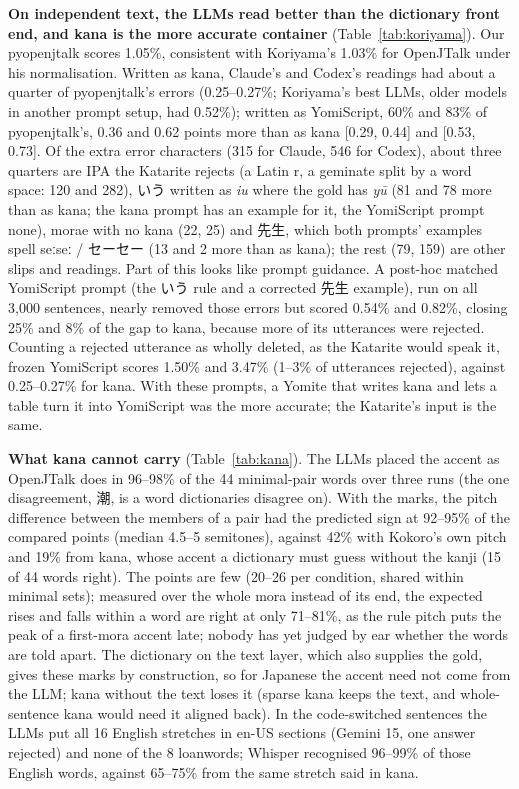 \documentclass{Interspeech}
\newcommand{\ys}[1]{\mbox{\ipafont #1}}
\begin{document}
\textbf{On independent text, the LLMs read better than the dictionary front end, and kana is the more accurate
container} (Table~\ref{tab:koriyama}). Our pyopenjtalk scores 1.05\%, consistent with Koriyama's 1.03\% for
OpenJTalk under his normalisation. Written as kana, Claude's and Codex's readings had about a quarter of pyopenjtalk's errors
(0.25--0.27\%; Koriyama's best LLMs, older models in another prompt setup, had 0.52\%); written as YomiScript, 60\% and
83\% of pyopenjtalk's, 0.36 and 0.62 points more than as kana [0.29, 0.44] and [0.53, 0.73]. Of the extra
error characters (315 for Claude, 546 for Codex), about three quarters are IPA the Katarite rejects (a Latin \ys{r},
a geminate split by a word space: 120 and 282), いう written as \emph{iu} where the gold has \emph{yū} (81 and 78
more than as kana; the kana prompt has an example for it, the YomiScript prompt none), morae with no kana (22, 25)
and 先生, which both prompts' examples spell \ys{seːseː} / セーセー (13 and 2 more than as kana); the rest
(79, 159) are other slips and readings. Part of this looks like prompt guidance. A post-hoc matched YomiScript prompt (the いう rule and a corrected 先生 example), run on all 3{,}000 sentences, nearly
removed those errors but scored 0.54\% and 0.82\%, closing 25\% and 8\% of the gap to kana, because more of its
utterances were rejected. Counting a rejected utterance as wholly deleted, as the Katarite would speak it, frozen
YomiScript scores 1.50\% and 3.47\% (1--3\% of utterances rejected), against 0.25--0.27\% for kana. With these prompts, a Yomite that writes
kana and lets a table turn it into YomiScript was the more accurate; the Katarite's input is the same.

\textbf{What kana cannot carry} (Table~\ref{tab:kana}). The LLMs placed the accent as OpenJTalk does in 96--98\% of
the 44 minimal-pair words over three runs (the one disagreement, 潮, is a word dictionaries disagree on). With the
marks, the pitch difference between the members of a pair had the predicted sign at 92--95\% of the compared points
(median 4.5--5 semitones), against 42\% with Kokoro's own pitch and 19\% from kana, whose accent a dictionary must
guess without the kanji (15 of 44 words right). The points are few (20--26 per condition, shared within minimal
sets); measured over the whole mora instead of its end, the expected rises and falls within a word
are right at only 71--81\%, as the rule pitch puts the peak of a first-mora accent late;
nobody has yet judged by ear whether the words are told apart. The dictionary on the text layer, which also supplies the gold, gives these marks by construction,
so for Japanese the accent need not come from the LLM; kana without the text loses it (sparse kana keeps the text, and
whole-sentence kana would need it aligned back). In the
code-switched sentences the LLMs put all 16 English stretches in \ys{en-US} sections (Gemini 15, one answer
rejected) and none of the 8 loanwords; Whisper recognised 96--99\% of those English words, against 65--75\% from
the same stretch said in kana.
\end{document}
